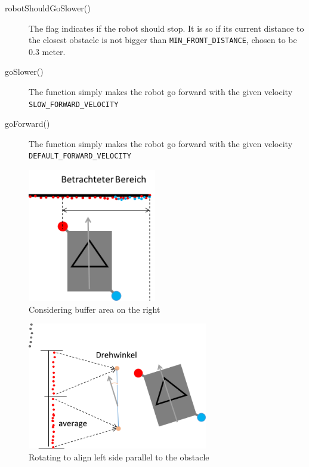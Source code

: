 \begin{description}
\item[robotShouldGoSlower()]  The flag indicates if the robot should stop. It is so if its current distance to the closest obstacle is not bigger than \texttt{MIN\_FRONT\_DISTANCE}, chosen to be 0.3 meter. 
\item[goSlower()] The function simply makes the robot go forward with the given velocity \\ \texttt{SLOW\_FORWARD\_VELOCITY}
\item[goForward()] The function simply makes the robot go forward with the given velocity \\ \texttt{DEFAULT\_FORWARD\_VELOCITY} 
\end{description}

\begin{figure}[ht]
\centering
\includegraphics[width=0.5\textwidth]{graphics/betrachteter_bereich.png}
\caption{Considering buffer area on the right}
\label{betrachteter_bereich}
\centering
\end{figure}

\begin{figure}[ht]
\centering
\includegraphics[width=0.7\textwidth]{graphics/rotate_left_parallel02.png}
\caption{Rotating to align left side parallel to the obstacle}
\label{rotate_left_parallel02}
\centering
\end{figure}

